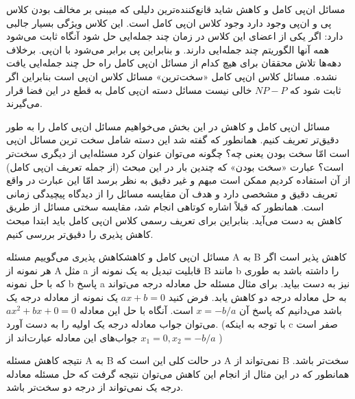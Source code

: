 \begin{itemframe}{مسائل ان‌پی کامل و کاهش}
\itm
شاید قانع‌کننده‌ترین دلیلی که میبنی بر مخالف بودن کلاس پی و ان‌پی وجود دارد وجود کلاس ان‌پی کامل است. این کلاس ویژگی بسیار جالبی دارد: اگر یکی از اعضای این کلاس در زمان چند جمله‌ایی حل شود آنگاه ثابت می‌شود همه آنها الگوریتم چند جمله‌ایی دارند. و بنابراین پی برابر می‌شود با ان‌پی.
\itm
برخلاف دهه‌ها تلاش محققان برای هیچ کدام از مسائل ان‌پی کامل راه حل چند جمله‌ایی یافت نشده.
\itm
مسائل کلاس ان‌پی کامل «سخت‌ترین» مسائل کلاس ان‌پی است بنابراین اگر ثابت شود که
$NP - P$
خالی نیست مسائل دسته ان‌پی کامل به قطع در این فضا قرار می‌گیرند.

\end{itemframe}

\begin{itemframe}{مسائل ان‌پی کامل و کاهش}
\itm
در این بخش می‌خواهیم مسائل ان‌پی کامل را به طور دقیق‌تر تعریف کنیم. همانطور که گفته شد این دسته شامل سخت ترین مسائل ان‌پی است امّا سخت بودن یعنی چه؟ چگونه می‌توان عنوان کرد مسئله‌ایی از دیگری سخت‌تر است؟
\itm
عبارت «سخت‌ بودن»
که چندین بار در این مبحث (از جمله تعریف ان‌پی کامل) از آن استفاده کردیم ممکن است مبهم و غیر دقیق به نظر برسد امّا این عبارت در واقع تعریف دقیق و مشخصی دارد و هدف آن مقایسه مسائل را از دیدگاه پیچیدگی زمانی است.
\itm
همانطور که قبلاً اشاره کوتاهی انجام شد، مقایسه سختی مسائل  از طریق کاهش به دست می‌آید. بنابراین برای تعریف رسمی کلاس ان‌پی کامل باید ابتدا مبحث کاهش پذیری را دقیق‌تر بررسی کنیم.
\end{itemframe}

\begin{itemframe-s}{مسائل ان‌پی کامل و کاهش}{کاهش پذیری}
\itm
می‌گوییم مسئله A به B کاهش پذیر
 است اگر هر نمونه از A مثل a قابلیت تبدیل به یک نمونه از B مانند b را داشته باشد به طوری که با حل نمونه b پاسخ a نیز به دست بیاید.
\itm
برای مثال مسئله حل معادله درجه می‌تواند به حل معادله درجه دو کاهش یابد. فرض کنید $ax+b=0$ یک نمونه از معادله درجه یک باشد می‌دانیم که پاسخ آن
$ x = -b/a $
است.
آنگاه با حل این معادله $ ax^2+bx+0=0 $ می‌توان جواب معادله درجه یک اولیه را به دست آورد. (با توجه به اینکه c صفر است جواب‌های این معادله عبارت‌اند از
$ x_1 = 0, x_2= -b/a $
)

\itm
نتیجه کاهش مسئله A به B در حالت کلی این است که A نمی‌تواند از B سخت‌تر باشد. همانطور که در این مثال از انجام این کاهش می‌توان نتیجه گرفت که حل مسئله معادله درجه یک نمی‌تواند از درجه دو سخت‌تر باشد.
\end{itemframe-s}

